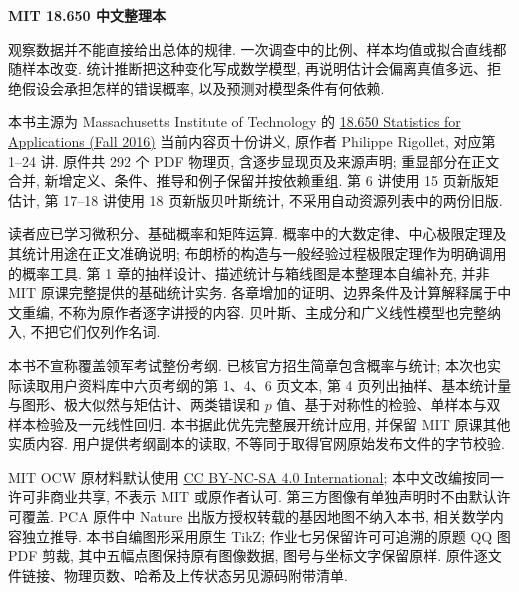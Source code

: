 \frontmatter
\begin{center}
{\color{structurecolor}\bfseries\fontsize{18}{25}\selectfont\BookTitle\par}
{\bfseries MIT 18.650 中文整理本\par}
\BookAuthor\par
\BookDate\par
\end{center}
\originalpreface
观察数据并不能直接给出总体的规律. 一次调查中的比例、样本均值或拟合直线都随样本改变. 统计推断把这种变化写成数学模型, 再说明估计会偏离真值多远、拒绝假设会承担怎样的错误概率, 以及预测对模型条件有何依赖.

本书主源为 Massachusetts Institute of Technology 的 \href{https://ocw.mit.edu/courses/18-650-statistics-for-applications-fall-2016/pages/lecture-slides/}{18.650 Statistics for Applications (Fall 2016)} 当前内容页十份讲义, 原作者 Philippe Rigollet, 对应第 1--24 讲. 原件共 292 个 PDF 物理页, 含逐步显现页及来源声明; 重显部分在正文合并, 新增定义、条件、推导和例子保留并按依赖重组. 第 6 讲使用 15 页新版矩估计, 第 17--18 讲使用 18 页新版贝叶斯统计, 不采用自动资源列表中的两份旧版.

读者应已学习微积分、基础概率和矩阵运算. 概率中的大数定律、中心极限定理及其统计用途在正文准确说明; 布朗桥的构造与一般经验过程极限定理作为明确调用的概率工具. 第 1 章的抽样设计、描述统计与箱线图是本整理本自编补充, 并非 MIT 原课完整提供的基础统计实务. 各章增加的证明、边界条件及计算解释属于中文重编, 不称为原作者逐字讲授的内容. 贝叶斯、主成分和广义线性模型也完整纳入, 不把它们仅列作名词.

本书不宣称覆盖领军考试整份考纲. 已核官方招生简章包含概率与统计; 本次也实际读取用户资料库中六页考纲的第 1、4、6 页文本, 第 4 页列出抽样、基本统计量与图形、极大似然与矩估计、两类错误和 $p$ 值、基于对称性的检验、单样本与双样本检验及一元线性回归. 本书据此优先完整展开统计应用, 并保留 MIT 原课其他实质内容. 用户提供考纲副本的读取, 不等同于取得官网原始发布文件的字节校验.

MIT OCW 原材料默认使用 \href{https://creativecommons.org/licenses/by-nc-sa/4.0/}{CC BY-NC-SA 4.0 International}; 本中文改编按同一许可非商业共享, 不表示 MIT 或原作者认可. 第三方图像有单独声明时不由默认许可覆盖. PCA 原件中 Nature 出版方授权转载的基因地图不纳入本书, 相关数学内容独立推导. 本书自编图形采用原生 TikZ; 作业七另保留许可可追溯的原题 QQ 图 PDF 剪裁, 其中五幅点图保持原有图像数据, 图号与坐标文字保留原样. 原件逐文件链接、物理页数、哈希及上传状态另见源码附带清单.
\par\medskip

\clearpage
\originalcontents
\clearpage
\mainmatter























